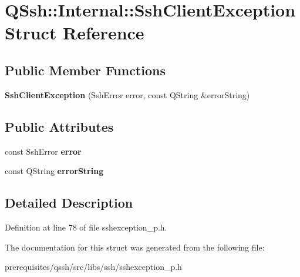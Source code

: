 \hypertarget{struct_q_ssh_1_1_internal_1_1_ssh_client_exception}{}\section{Q\+Ssh\+:\+:Internal\+:\+:Ssh\+Client\+Exception Struct Reference}
\label{struct_q_ssh_1_1_internal_1_1_ssh_client_exception}
\subsection*{Public Member Functions}
\begin{DoxyCompactItemize}
\item 
\mbox{\label{struct_q_ssh_1_1_internal_1_1_ssh_client_exception_ab78880c7f4bf8370ea23a26682852173}} 
{\bfseries Ssh\+Client\+Exception} (Ssh\+Error error, const Q\+String \&error\+String)
\end{DoxyCompactItemize}
\subsection*{Public Attributes}
\begin{DoxyCompactItemize}
\item 
\mbox{\label{struct_q_ssh_1_1_internal_1_1_ssh_client_exception_ac8d35ea09015acc563933cfffe90663b}} 
const Ssh\+Error {\bfseries error}
\item 
\mbox{\label{struct_q_ssh_1_1_internal_1_1_ssh_client_exception_a610a78ae1ad56f429d03bb68edcf4e4e}} 
const Q\+String {\bfseries error\+String}
\end{DoxyCompactItemize}


\subsection{Detailed Description}


Definition at line 78 of file sshexception\+\_\+p.\+h.



The documentation for this struct was generated from the following file\+:\begin{DoxyCompactItemize}
\item 
prerequisites/qssh/src/libs/ssh/sshexception\+\_\+p.\+h\end{DoxyCompactItemize}
